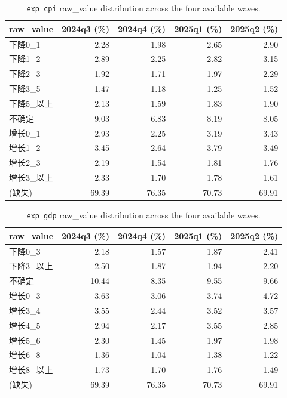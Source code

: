 \documentclass[11pt,letterpaper,english,final]{article}
\begin{document}
\begin{table}[H]
\centering
\small
\setlength{\tabcolsep}{6pt}
\caption{\texttt{exp\_cpi} raw\_value distribution across the four available waves.}
\label{tab:exp_cpi_dist}
\begin{tabular}{@{}l r r r r@{}}
\toprule
{raw\_value} & {2024q3 (\%)} & {2024q4 (\%)} & {2025q1 (\%)} & {2025q2 (\%)} \\
\midrule
下降0\_1    & 2.28  & 1.98  & 2.65  & 2.90  \\
下降1\_2    & 2.89  & 2.25  & 2.82  & 3.15  \\
下降2\_3    & 1.92  & 1.71  & 1.97  & 2.29  \\
下降3\_5    & 1.47  & 1.18  & 1.25  & 1.52  \\
下降5\_以上  & 2.13  & 1.59  & 1.83  & 1.90  \\
不确定     & 9.03  & 6.83  & 8.19  & 8.05  \\
增长0\_1    & 2.93  & 2.25  & 3.19  & 3.43  \\
增长1\_2    & 3.45  & 2.64  & 3.79  & 3.49  \\
增长2\_3    & 2.19  & 1.54  & 1.81  & 1.76  \\
增长3\_以上  & 2.33  & 1.70  & 1.78  & 1.61  \\
\midrule
(缺失)     & 69.39 & 76.35 & 70.73 & 69.91 \\
\bottomrule
\end{tabular}
\end{table}

\begin{table}[H]
\centering
\small
\setlength{\tabcolsep}{6pt}
\caption{\texttt{exp\_gdp} raw\_value distribution across the four available waves.}
\label{tab:exp_gdp_dist}
\begin{tabular}{@{}l r r r r@{}}
\toprule
{raw\_value} & {2024q3 (\%)} & {2024q4 (\%)} & {2025q1 (\%)} & {2025q2 (\%)} \\
\midrule
下降0\_3    & 2.18  & 1.57  & 1.87  & 2.41  \\
下降3\_以上  & 2.50  & 1.87  & 1.94  & 2.20  \\
不确定     & 10.44 & 8.35  & 9.55  & 9.66  \\
增长0\_3    & 3.63  & 3.06  & 3.74  & 4.72  \\
增长3\_4    & 3.55  & 2.44  & 3.52  & 3.57  \\
增长4\_5    & 2.94  & 2.17  & 3.55  & 2.85  \\
增长5\_6    & 2.30  & 1.45  & 1.97  & 1.98  \\
增长6\_8    & 1.36  & 1.04  & 1.38  & 1.22  \\
增长8\_以上  & 1.73  & 1.70  & 1.76  & 1.49  \\
\midrule
(缺失)     & 69.39 & 76.35 & 70.73 & 69.91 \\
\bottomrule
\end{tabular}
\end{table}
\end{document}

